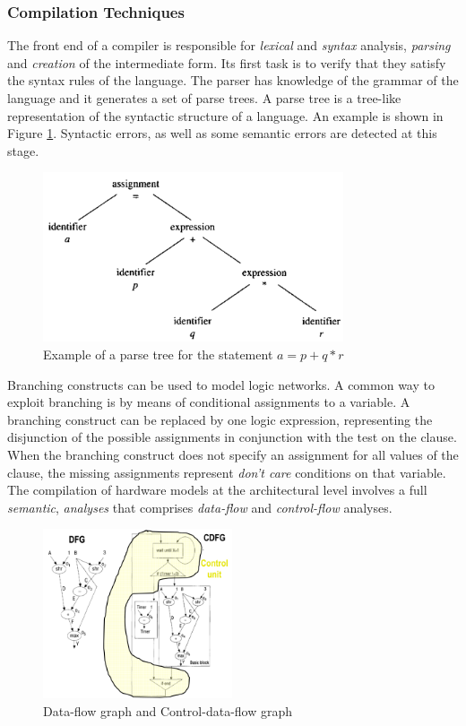 \subsubsection{Compilation  Techniques}
The front end of a compiler is responsible for  \textit{lexical}  and  \textit{syntax} analysis, \textit{parsing}  and \textit{creation} of the intermediate form. Its first task is to verify that they satisfy the syntax rules of the language. The parser has knowledge of the grammar of the language and it generates a set of  parse trees.  A parse tree is a tree-like representation of the syntactic structure of a language. An example is shown in Figure \ref{fig:parseTree}. Syntactic errors, as well as some semantic errors are detected at this stage.
\begin{figure}[H]
	 \centering
	 \includegraphics[height=50mm]{./Cap3/Images/Image03.png}
	 \caption[Optional caption]{Example  of  a  parse  tree  for  the statement  $ a  =  p  +  q  *  r $}
	 \label{fig:parseTree}
\end{figure}
Branching constructs can be used to model logic networks. A common way to exploit branching is by means of conditional assignments to a variable.  A  branching construct can be replaced by one logic expression, representing the disjunction of the possible assignments in conjunction with the test on the clause. When the branching construct does not specify an assignment for all values of the clause, the missing assignments represent  \textit{don't  care}  conditions on that variable. The compilation of hardware models at the architectural level involves a full \textit{semantic}, \textit{analyses}  that comprises  \textit{data-flow}  and  \textit{control-flow}  analyses.
\begin{figure}[H]
	 \centering
	 \includegraphics[height=50mm]{./Cap3/Images/Image04.png}
	 \caption[Optional caption]{Data-flow graph and Control-data-flow graph}
	 \label{fig:dataFlow}
\end{figure}

